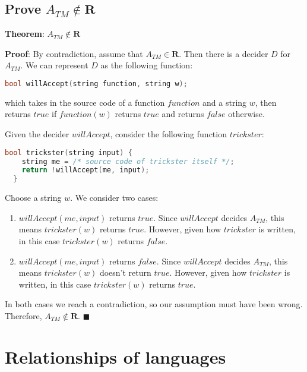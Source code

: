 \documentclass[12pt, letterpaper, oneside]{book}
\begin{document}
\subsection{Prove $A_{TM} \notin \textbf{R}$}

\textbf{Theorem}: $A_{TM} \notin \textbf{R}$

\textbf{Proof}: By contradiction, assume that $A_{TM} \in \mathbf{R}$. Then there is a decider $D$ for $A_{TM}$. We can
represent $D$ as the following function:

\begin{lstlisting}[language=C++]
  bool willAccept(string function, string w);
\end{lstlisting}

which takes in the source code of a function $function$ and a string $w$, then returns $true$ if $function(w)$ returns
$true$ and returns $false$ otherwise.

Given the decider $willAccept$, consider the following function $trickster$:

\begin{lstlisting}[language=C++]
  bool trickster(string input) {
    string me = /* source code of trickster itself */;
    return !willAccept(me, input);
  }
\end{lstlisting}

Choose a string $w$. We consider two cases:
\begin{enumerate}
  \item $willAccept(me, input)$ returns $true$. Since $willAccept$ decides $A_{TM}$, this means $trickster(w)$ returns
        $true$. However, given how $trickster$ is written, in this case $trickster(w)$ returns $false$.
  \item $willAccept(me, input)$ returns $false$. Since $willAccept$ decides $A_{TM}$, this means $trickster(w)$ doesn't
        return $true$. However, given how $trickster$ is written, in this case $trickster(w)$ returns $true$.
\end{enumerate}

In both cases we reach a contradiction, so our assumption must have been wrong. Therefore, $A_{TM} \notin \textbf{R}$.
$\blacksquare$

\section{Relationships of languages}
\end{document}
